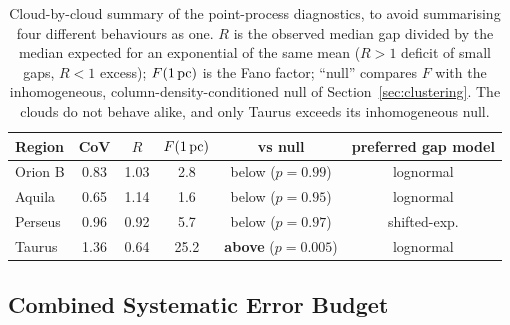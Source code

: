 \documentclass[usenatbib,twoside,twocolumn]{mnras}
\begin{document}
\begin{table}
\caption{Cloud-by-cloud summary of the point-process diagnostics, to avoid summarising four different behaviours as one. $R$ is the observed median gap divided by the median expected for an exponential of the same mean ($R>1$ deficit of small gaps, $R<1$ excess); $F(1\,{\rm pc})$ is the Fano factor; ``null'' compares $F$ with the inhomogeneous, column-density-conditioned null of Section~\ref{sec:clustering}. The clouds do not behave alike, and only Taurus exceeds its inhomogeneous null.}
\label{tab:percloud}
\footnotesize
\setlength{\tabcolsep}{3.5pt}
\begin{tabular}{lccccc}
\toprule
Region & CoV & $R$ & $F(1\,{\rm pc})$ & vs null & preferred gap model \\
\midrule
Orion B & 0.83 & 1.03 & 2.8 & below ($p=0.99$) & lognormal \\
Aquila  & 0.65 & 1.14 & 1.6 & below ($p=0.95$) & lognormal \\
Perseus & 0.96 & 0.92 & 5.7 & below ($p=0.97$) & shifted-exp. \\
Taurus  & 1.36 & 0.64 & 25.2 & \textbf{above} ($p=0.005$) & lognormal \\
\bottomrule
\end{tabular}
\end{table}

\subsection{Combined Systematic Error Budget}
\label{sec:error_budget}
\end{document}
